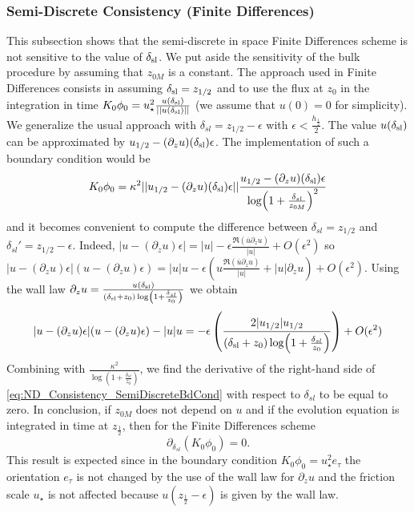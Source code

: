 \subsubsection{Semi-Discrete Consistency (Finite Differences)}
This subsection shows that the semi-discrete in space
Finite Differences
scheme is not sensitive to the value of $\delta_{\rm sl}$.
We put aside the sensitivity of the bulk procedure by
assuming that $z_{0M}$ is a constant.
%
The approach used in Finite Differences consists in assuming
$\delta_{\rm sl} = z_{1/2}$ and to use the flux at $z_0$ in
the integration in time
$K_0\phi_0 = u_\star^2
\frac{u(\delta_{\rm sl})}{||u(\delta_{\rm sl})||}$
(we assume that $u(0)=0$ for simplicity).
We generalize the usual approach with
$\delta_{sl} = z_{1/2} - \epsilon$ with
$\epsilon < \frac{h_{\frac{1}{2}}}{2}$. 
The value $u(\delta_{\rm sl})$ can be approximated
by $u_{1/2} - (\partial_z u)(\delta_{\rm sl})\epsilon$.
The implementation of such a boundary condition would be
\begin{equation}
	\label{eq:ND_Consistency_SemiDiscreteBdCond}
K_0\phi_0 = 
\kappa^2 ||u_{1/2} - (\partial_z u)(\delta_{\rm sl})\epsilon ||
	\frac{u_{1/2} - (\partial_z u)(\delta_{\rm sl})\epsilon 
}{\log(1+\frac{\delta_{sl}}{z_{0M}})^2}
\end{equation}
and it becomes convenient to compute the difference between
$\delta_{sl}=z_{1/2}$ and $\delta_{sl}'=z_{1/2}-\epsilon$.
Indeed,
$|u - (\partial_z u) \epsilon| = |u| -
\epsilon \frac{\mathfrak{R}(\overline{u} \partial_z u)}{|u|}
+ O(\epsilon^2)$ so
$|u - (\partial_z u) \epsilon|(u - (\partial_z u) \epsilon) =
|u|u -
\epsilon \left(
u\frac{\mathfrak{R}(\overline{u} \partial_z u)}{|u|}
+ |u| \partial_z u
\right)
+ O(\epsilon^2)$.
Using the wall law
$\partial_z u=\frac{u(\delta_{\rm sl})}{(\delta_{\rm sl} + z_0)
\log(1+\frac{\delta_{sl}}{z_0})}$ we obtain 
\begin{equation}
|u - (\partial_z u) \epsilon|(u - (\partial_z u) \epsilon) - |u|u =
	- \epsilon \left(\frac{2|u_{1/2}|u_{1/2}}
	{(\delta_{\rm sl} + z_0) \log(1+\frac{\delta_{sl}}{z_0})}
	\right)+ O(\epsilon^2)
\end{equation}
Combining with $\frac{\kappa^2}{\log(1+\frac{\delta_{sl}}{z_0})}$,
we find the derivative of the right-hand side of
\eqref{eq:ND_Consistency_SemiDiscreteBdCond} with respect to
$\delta_{sl}$ to be equal to zero.
In conclusion, if $z_{0M}$ does not depend on $u$ and if
the evolution equation is integrated in time at $z_\frac{1}{2}$,
then for the Finite Differences scheme
\begin{equation}
	\partial_{\delta_{sl}} (K_0 \phi_0) = 0.
\end{equation}
This result is expected since in the boundary condition
$K_0 \phi_0 = u_\star^2 e_\tau$ the orientation $e_\tau$ is
not changed by the use of the wall law for $\partial_z u$
and the friction scale $u_\star$ is not affected because
$u(z_\frac{1}{2} - \epsilon)$ is given by the wall law.
